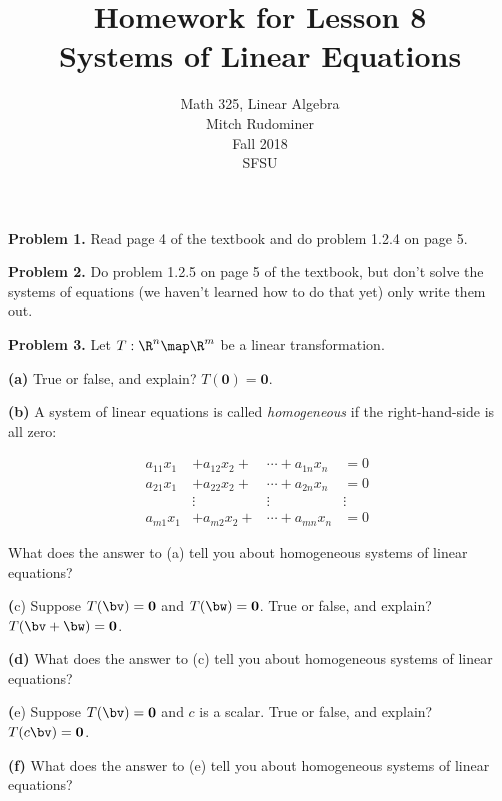 \documentclass[oneside,12pt]{amsart}
\begin{document}
\title{Homework for Lesson 8 \\ Systems of Linear Equations}
\author{Math 325, Linear Algebra \\ Mitch Rudominer \\ Fall 2018 \\ SFSU }
\date{}

\maketitle

\textbf{Problem 1.} Read page 4 of the textbook and do problem 1.2.4 on
page 5.

\bigskip
\bigskip
\bigskip
\bigskip
\bigskip
\bigskip
\bigskip
\bigskip
\bigskip
\bigskip

\textbf{Problem 2.} Do problem 1.2.5 on page 5 of the textbook, but don't
solve the systems of equations (we haven't learned how to do that yet)
only write them out.

\bigskip
\bigskip
\bigskip
\bigskip
\bigskip
\bigskip
\bigskip
\bigskip
\bigskip
\bigskip

\textbf{Problem 3.} Let $T:\R^n\map\R^m$ be a linear transformation.

\textbf{(a)} True or false, and explain? $T(\mathbf{0}) = \mathbf{0}$.

\bigskip

\textbf{(b)} A system of linear equations is called \emph{homogeneous} if the
right-hand-side is all zero:

\begin{align*}
 a_{11}x_1 &+ a_{12}x_2 + &\cdots + a_{1n} x_n &= 0\\
 a_{21}x_1 &+ a_{22}x_2 + &\cdots + a_{2n} x_n &= 0\\
 \quad &{ \vdots \quad} \quad &{ \vdots \quad} \quad  &{ \vdots \quad} \quad\\
 a_{m1}x_1 &+ a_{m2}x_2 + &\cdots + a_{mn} x_n &= 0
\end{align*}

What does the answer to (a) tell you about homogeneous systems of linear equations?

\bigskip

\textbf(c) Suppose $T(\bv) = \mathbf{0}$ and $T(\bw) = \mathbf{0}$.
True or false, and explain? $T(\bv + \bw) = \mathbf{0}$.

\bigskip

\textbf{(d)} What does the answer to (c) tell you about homogeneous systems of linear equations?

\bigskip

\textbf(e) Suppose $T(\bv) = \mathbf{0}$ and $c$ is a scalar.
True or false, and explain? $T(c\bv) = \mathbf{0}$.

\bigskip

\textbf{(f)} What does the answer to (e) tell you about homogeneous systems of linear equations?
\end{document}
